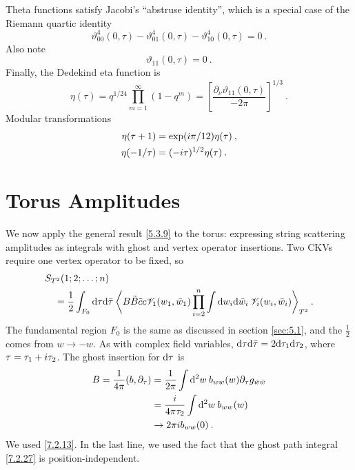 Theta functions satisfy Jacobi's ``abstruse identity'', which is a special case of the Riemann quartic identity 
\begin{equation}
	\vartheta_{00}^{4}(0, \tau)-\vartheta_{01}^{4}(0, \tau)-\vartheta_{10}^{4}(0, \tau)=0 \:. \label{7.2.41}
\end{equation}
Also note 
\begin{equation}
	\vartheta_{11}(0, \tau)=0 \:. \label{7.2.42} 
\end{equation}
Finally, the Dedekind eta function is 
\begin{equation}
	\eta(\tau)=q^{1 / 24} \prod_{m=1}^{\infty}(1-q^{m})=\left[\frac{\partial_{\nu} \vartheta_{11}(0, \tau)}{-2 \pi}\right]^{1/3} \:. \label{7.2.43} 
\end{equation}
Modular transformations 
\begin{subequations} \label{7.2.44}
	\begin{align}
		\eta(\tau+1) &=\exp (i \pi / 12) \eta(\tau)  \:, \label{7.2.44a} \\
		\eta(-1 / \tau) &=(-i \tau)^{1 / 2} \eta(\tau) \:. \label{7.2.44b} 
	\end{align}
\end{subequations}

\section{\texorpdfstring{Torus Amplitudes}{7.3 Torus Amplitudes}} \label{sec:7.3} 
We now apply the general result \eqref{5.3.9} to the torus: expressing string scattering amplitudes as integrals with ghost and vertex operator insertions. Two CKVs require one vertex operator to be fixed, so 
\begin{align}
	&S_{T^{2}}(1 ; 2 ; \ldots ; n)  \nonumber \\
	&\quad=\frac{1}{2} \int_{F_{0}} \mathrm{d} \tau \mathrm{d} \bar{\tau} \:
	\biggl\langle B \tilde{B} \tilde{c} c \mathscr{V}_{1}(w_{1}, \bar{w}_{1}) 
	\prod_{i=2}^{n} \int \mathrm{d} w_{i} \mathrm{d} \bar{w}_{i} \: \mathscr{V}_{i}(w_{i}, \bar{w}_{i})\biggr\rangle_{T^{2}} \:. \label{7.3.1} 
\end{align}
The fundamental region $F_{0}$ is the same as discussed in section \ref{sec:5.1}, and the $\frac{1}{2}$ comes from $w \rightarrow-w$. As with complex field variables, $\mathrm{d} \tau \mathrm{d} \bar{\tau}=2 \mathrm{d} \tau_{1} \mathrm{d} \tau_{2}$, where $\tau=\tau_{1}+i \tau_{2}$. 
The ghost insertion for $\mathrm{d} \tau$ is 
\begin{align}
	B=\frac{1}{4 \pi}(b, \partial_{\tau}) &=\frac{1}{2 \pi} \int \mathrm{d}^{2} w \: b_{w w}(w) \partial_{\tau} g_{\bar{w} \bar{w}} \nonumber \\
	&=\frac{i}{4 \pi \tau_{2}} \int \mathrm{d}^{2} w \: b_{w w}(w) \nonumber \\
	& \rightarrow 2 \pi i b_{w w}(0) \:. \label{7.3.2} 
\end{align}
We used \eqref{7.2.13}. In the last line, we used the fact that the ghost path integral \eqref{7.2.27} is position-independent. 

